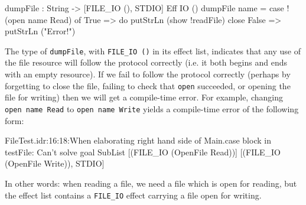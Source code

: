 \begin{code}
dumpFile : String -> { [FILE_IO (), STDIO] } Eff IO ()
dumpFile name = case !(open name Read) of
                    True => do putStrLn (show !readFile)
                               close
                    False => putStrLn ("Error!")
\end{code}

\noindent
The type of \texttt{dumpFile}, with \texttt{FILE\_IO ()} in its effect
list, indicates that any use of the file resource will follow the protocol
correctly (i.e. it both begins and ends with an empty resource). If we fail
to follow the protocol correctly (perhaps by forgetting to close the file,
failing to check that \texttt{open} succeeded, or opening the file for writing)
then we will get a compile-time error. For example, changing \texttt{open name Read}
to \texttt{open name Write} yields a compile-time error of the following
form:

\begin{code}
FileTest.idr:16:18:When elaborating right hand side of Main.case 
block in testFile:
Can't solve goal 
        SubList [(FILE_IO (OpenFile Read))]
                [(FILE_IO (OpenFile Write)), STDIO]
\end{code}

\noindent
In other words: when reading a file, we need a file which is open for reading,
but the effect list contains a \texttt{FILE\_IO} effect carrying a file open
for writing.




